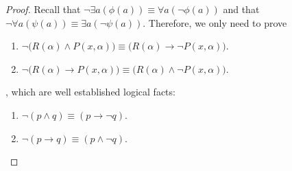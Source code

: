 \begin{proof}
	Recall that $\neg\exists a(\phi(a)) \equiv \forall a(\neg \phi(a))$ and that $\neg\forall a(\psi(a)) \equiv \exists a(\neg\psi(a))$. Th\-erefore, we only need to prove
	\begin{enumerate}
		\item $\neg\bigl( R(\alpha) \wedge P(x,\alpha) \bigr) \equiv \bigl( R(\alpha) \to \neg P(x,\alpha) \bigr)$.
		\item $\neg\bigl( R(\alpha) \to P(x,\alpha) \bigr) \equiv \bigl( R(\alpha) \wedge \neg P(x,\alpha) \bigr)$.
	\end{enumerate}
	, which are well established logical facts:
	\begin{enumerate}
		\item $\neg (p \wedge q) \equiv (p \to \neg q)$.
		\item $\neg (p \to q) \equiv (p \wedge \neg q)$.
	\end{enumerate}
\end{proof}

